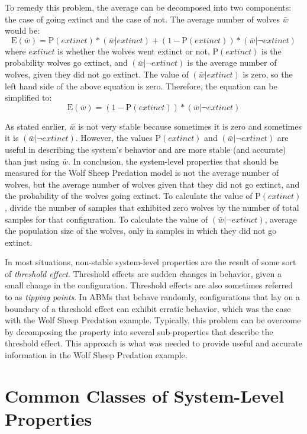 To remedy this problem, the average can be decomposed into two components: the case of going extinct and the case of not.
The average number of wolves $\bar w$ would be:
\[\mathrm{E}(\bar w) = \mathrm{P}(extinct) * (\bar w | extinct) + (1 - \mathrm{P}(extinct)) * (\bar w | \neg extinct) \]
where $extinct$ is whether the wolves went extinct or not, $\mathrm{P}(extinct)$ is the probability wolves go extinct, and $(\bar w | \neg extinct)$ is the average number of wolves, given they did not go extinct.
The value of $(\bar w | extinct)$ is zero, so the left hand side of the above equation is zero.
Therefore, the equation can be simplified to:
\[\mathrm{E}(\bar w) = (1 - \mathrm{P}(extinct)) * (\bar w | \neg extinct) \]

As stated earlier, $\bar w$ is not very stable because sometimes it is zero and sometimes it is $(\bar w | \neg extinct)$.
However, the values $\mathrm{P}(extinct)$ and $(\bar  w | \neg extinct)$ are useful in describing the system's behavior and are more stable (and accurate) than just using $\bar w$.
In conclusion, the system-level properties that should be measured for the Wolf Sheep Predation model is not the average number of wolves, but the average number of wolves given that they did not go extinct, and the probability of the wolves going extinct.
To calculate the value of $\mathrm{P}(extinct)$, divide the number of samples that exhibited zero wolves by the number of total samples for that configuration.
To calculate the value of $(\bar w | \neg extinct)$, average the population size of the wolves, only in samples in which they did not go extinct.

In most situations, non-stable system-level properties are the result of some sort of \textit{threshold effect}.
Threshold effects are sudden changes in behavior, given a small change in the configuration.
Threshold effects are also sometimes referred to as \textit{tipping points}.
In ABMs that behave randomly, configurations that lay on a boundary of a threshold effect can exhibit erratic behavior, which was the case with the Wolf Sheep Predation example.
Typically, this problem can be overcome by decomposing the property into several sub-properties that describe the threshold effect. 
This approach is what was needed to provide useful and accurate information in the Wolf Sheep Predation example.


\section{Common Classes of System-Level Properties}

